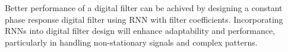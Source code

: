Better performance of a digital filter can be achived by designing a constant phase response digital filter using RNN with filter coefficients. Incorporating RNNs into digital filter design will enhance adaptability and performance, particularly in handling non-stationary signals and complex patterns.